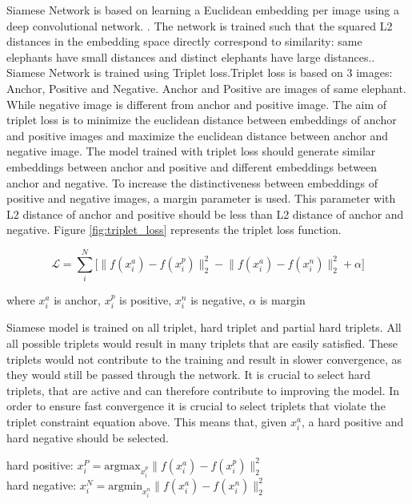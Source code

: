 \documentclass[10pt,twocolumn,letterpaper]{article}
\begin{document}
Siamese Network is based on learning a Euclidean embedding per image using a deep convolutional network. \cite{Facenet}. The network is trained such that the squared L2 distances in the embedding space directly correspond to similarity: same elephants have small distances and distinct elephants have large distances.\cite{Facenet}. Siamese Network is trained using Triplet loss.Triplet loss is based on 3 images: Anchor, Positive and Negative. Anchor and Positive are images of same elephant. While negative image is different from anchor and positive image. The aim of triplet loss is to minimize the euclidean distance between embeddings of anchor and positive images and maximize the euclidean distance between anchor and negative image. The model trained with triplet loss should generate similar embeddings between anchor and positive and different embeddings between anchor and negative. To increase the distinctiveness between embeddings of positive and negative images, a margin parameter is used. This parameter with L2 distance of anchor and positive should be less than L2 distance of anchor and negative. Figure \ref{fig:triplet_loss} represents the triplet loss function.

$$
\mathcal{L} = \sum_{i}^N \Big[ \lVert f(x_i^a) - f(x_i^p)\rVert_2^2 - \lVert f(x_i^a) - f(x_i^n)\rVert_2^2  + \alpha \Big]
$$

where $x_i^a$ is anchor, $x_i^p$ is positive, $x_i^n$ is negative, $\alpha$ is margin


Siamese model is trained on all triplet, hard triplet and partial hard triplets. All all possible triplets would result in many triplets that are easily satisfied. These triplets would not contribute to the training and result in slower convergence, as they would still be passed through the network. It is crucial to select hard triplets, that are active and can therefore contribute to improving the model. In order to ensure fast convergence it is crucial to select triplets that violate the triplet constraint equation above. \cite{Facenet} This means that, given $x_i^a$, a hard positive and hard negative should be selected.

hard positive: $x_i^P = \text{argmax}_{x_i^p}  \lVert f(x_i^a) - f(x_i^p)\rVert_2^2$ \\

hard negative: $x_i^N = \text{argmin}_{x_i^n}  \lVert f(x_i^a) - f(x_i^n)\rVert_2^2$ \\
\end{document}
